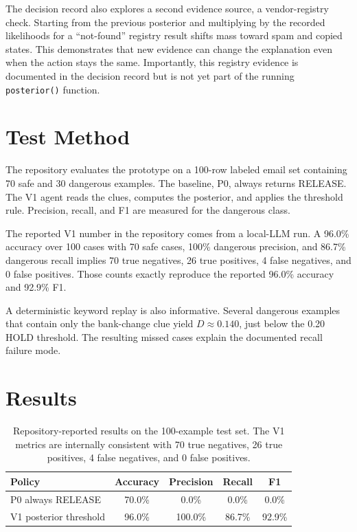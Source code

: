 \documentclass{article}
\begin{document}
The decision record also explores a second evidence source, a vendor-registry check. Starting from the previous posterior and multiplying by the recorded likelihoods for a ``not-found'' registry result shifts mass toward spam and copied states. This demonstrates that new evidence can change the explanation even when the action stays the same. Importantly, this registry evidence is documented in the decision record but is not yet part of the running \texttt{posterior()} function.

\section{Test Method}

The repository evaluates the prototype on a 100-row labeled email set containing 70 safe and 30 dangerous examples. The baseline, P0, always returns RELEASE. The V1 agent reads the clues, computes the posterior, and applies the threshold rule. Precision, recall, and F1 are measured for the dangerous class.

The reported V1 number in the repository comes from a local-LLM run. A 96.0\% accuracy over 100 cases with 70 safe cases, 100\% dangerous precision, and 86.7\% dangerous recall implies 70 true negatives, 26 true positives, 4 false negatives, and 0 false positives. Those counts exactly reproduce the reported 96.0\% accuracy and 92.9\% F1.

A deterministic keyword replay is also informative. Several dangerous examples that contain only the bank-change clue yield \(D \approx 0.140\), just below the 0.20 HOLD threshold. The resulting missed cases explain the documented recall failure mode.

\section{Results}

\begin{table}[t]
\centering
\begin{tabular}{lcccc}
\toprule
Policy & Accuracy & Precision & Recall & F1 \\
\midrule
P0 always RELEASE & 70.0\% & 0.0\% & 0.0\% & 0.0\% \\
V1 posterior threshold & 96.0\% & 100.0\% & 86.7\% & 92.9\% \\
\bottomrule
\end{tabular}
\caption{Repository-reported results on the 100-example test set. The V1 metrics are internally consistent with 70 true negatives, 26 true positives, 4 false negatives, and 0 false positives.}
\label{tab:results}
\end{table}
\end{document}
